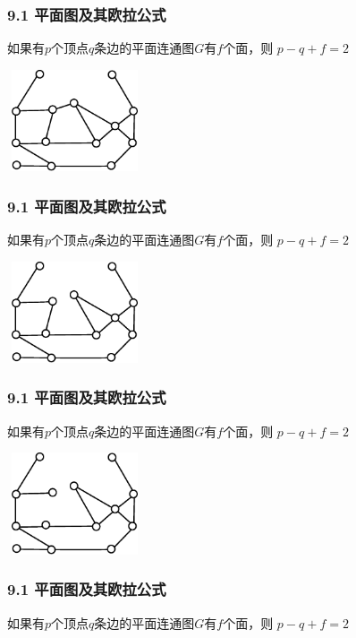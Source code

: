 \documentclass{beamer}
\begin{document}
\begin{CJK}{UTF8}{gbsn}
\begin{frame}
  \frametitle{9.1 平面图及其欧拉公式}
  \begin{Thm1}
    如果有$p$个顶点$q$条边的平面连通图$G$有$f$个面，则
      $p - q + f = 2$
  \end{Thm1}
\vspace{1cm}
\centering
    \includegraphics[width=4cm,height=3cm]{euler1}
\end{frame}
\begin{frame}
  \frametitle{9.1 平面图及其欧拉公式}
  \begin{Thm1}
    如果有$p$个顶点$q$条边的平面连通图$G$有$f$个面，则
      $p - q + f = 2$
  \end{Thm1}
\vspace{1cm}
\centering
    \includegraphics[width=4cm,height=3cm]{euler2}
\end{frame}
\begin{frame}
  \frametitle{9.1 平面图及其欧拉公式}
  \begin{Thm1}
    如果有$p$个顶点$q$条边的平面连通图$G$有$f$个面，则
      $p - q + f = 2$
  \end{Thm1}
\vspace{1cm}
\centering
    \includegraphics[width=4cm,height=3cm]{euler3}
\end{frame}
\begin{frame}
  \frametitle{9.1 平面图及其欧拉公式}
  \begin{Thm1}
    如果有$p$个顶点$q$条边的平面连通图$G$有$f$个面，则
      $p - q + f = 2$
  \end{Thm1}

\end{frame}
\end{CJK}
\end{document}
